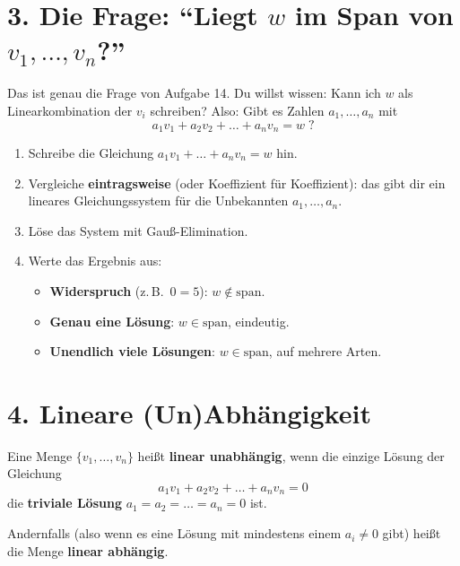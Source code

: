 \documentclass[a4paper,12pt]{article}
\begin{document}
\section*{3. Die Frage: ``Liegt $w$ im Span von $v_1, \ldots, v_n$?''}

Das ist genau die Frage von Aufgabe 14. Du willst wissen: Kann ich $w$ als Linearkombination der $v_i$ schreiben? Also: Gibt es Zahlen $a_1, \ldots, a_n$ mit
\[
a_1 v_1 + a_2 v_2 + \ldots + a_n v_n = w \; ?
\]

\begin{rezept}[title={Kochrezept: ``Ist $w$ im Span?''}]
\begin{enumerate}
    \item Schreibe die Gleichung $a_1 v_1 + \ldots + a_n v_n = w$ hin.
    \item Vergleiche \textbf{eintragsweise} (oder Koeffizient f\"ur Koeffizient): das gibt dir ein lineares Gleichungssystem f\"ur die Unbekannten $a_1, \ldots, a_n$.
    \item L\"ose das System mit Gau\ss-Elimination.
    \item Werte das Ergebnis aus:
    \begin{itemize}
        \item \textbf{Widerspruch} (z.\,B.\ $0 = 5$): $w \notin \text{span}$.
        \item \textbf{Genau eine L\"osung}: $w \in \text{span}$, eindeutig.
        \item \textbf{Unendlich viele L\"osungen}: $w \in \text{span}$, auf mehrere Arten.
    \end{itemize}
\end{enumerate}
\end{rezept}

\section*{4. Lineare (Un)Abh\"angigkeit}

\begin{merkbox}[title={Definition}]
Eine Menge $\{v_1, \ldots, v_n\}$ hei\ss t \textbf{linear unabh\"angig}, wenn die einzige L\"osung der Gleichung
\[
a_1 v_1 + a_2 v_2 + \ldots + a_n v_n = 0
\]
die \textbf{triviale L\"osung} $a_1 = a_2 = \ldots = a_n = 0$ ist.

\medskip
Andernfalls (also wenn es eine L\"osung mit mindestens einem $a_i \neq 0$ gibt) hei\ss t die Menge \textbf{linear abh\"angig}.
\end{merkbox}
\end{document}
